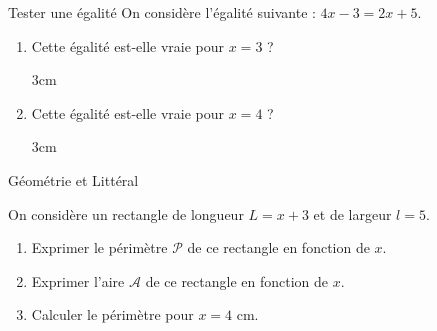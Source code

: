 \documentclass[a4paper]{book}
\begin{document}
    \begin{exerciceTitre}{Tester une égalité}
        On considère l'égalité suivante : $4x - 3 = 2x + 5$.
        
        \begin{enumerate}
            \item Cette égalité est-elle vraie pour $x = 3$ ?
            \begin{ZoneReponse}{3cm}\end{ZoneReponse}
            
            \item Cette égalité est-elle vraie pour $x = 4$ ?
            \begin{ZoneReponse}{3cm}\end{ZoneReponse}
        \end{enumerate}
    \end{exerciceTitre}
    
    \begin{exerciceTitre}{Géométrie et Littéral}
        \begin{minipage}{0.6\linewidth}
            On considère un rectangle de longueur $L = x + 3$ et de largeur $l = 5$.
            \begin{enumerate}
                \item Exprimer le périmètre $\mathcal{P}$ de ce rectangle en fonction de $x$.
                \item Exprimer l'aire $\mathcal{A}$ de ce rectangle en fonction de $x$.
                \item Calculer le périmètre pour $x = 4$ cm.
            \end{enumerate}
        \end{minipage}
        \hfill
        \begin{minipage}{0.35\linewidth}
        \end{minipage}
    \end{exerciceTitre}
      
\end{document}
